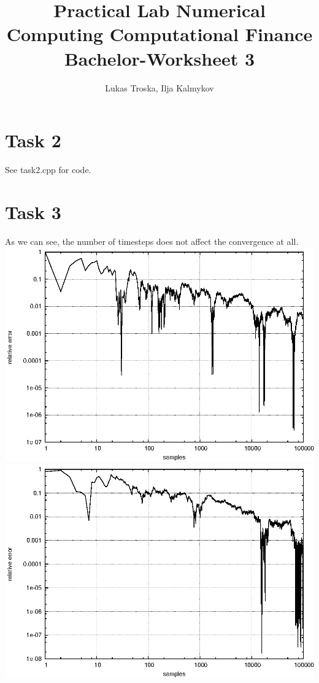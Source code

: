 \documentclass[]{article}
\title{Practical Lab Numerical Computing Computational Finance \\Bachelor-Worksheet 3}
\author{Lukas Troska, Ilja Kalmykov}
\date{}
\begin{document}
\maketitle
\section*{Task 2}
See task2.cpp for code.

\section*{Task 3}
As we can see, the number of timesteps does not affect the convergence at all.\\
\includegraphics{task3_10.eps}\\
\includegraphics{task3_200.eps}\\
\end{document}

